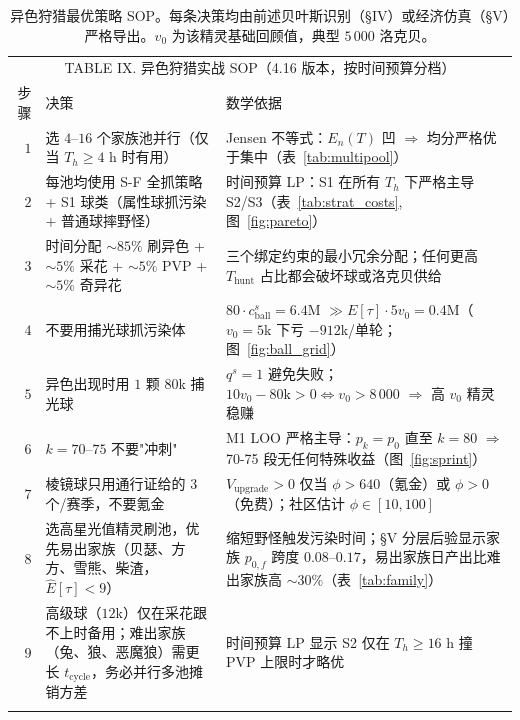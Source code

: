 \documentclass[journal]{IEEEtran}
\begin{document}
\begin{table}[t]
    \begin{center}
        \small
        \begin{tabular}{rp{}p{}}
            \multicolumn{3}{c}{\textsc{TABLE IX. 异色狩猎实战 SOP（4.16 版本，按时间预算分档）}} \\
            \hhline{===}
            步骤 & 决策 & 数学依据 \\
            \hline
            $1$ & 选 $4$--$16$ 个家族池并行（仅当 $T_h \ge 4$ h 时有用） & Jensen 不等式：$E_n(T)$ 凹 $\Rightarrow$ 均分严格优于集中（表~\ref{tab:multipool}） \\
            $2$ & 每池均使用 S-F 全抓策略 + S1 球类（属性球抓污染 + 普通球摔野怪） & 时间预算 LP：S1 在所有 $T_h$ 下严格主导 S2/S3（表~\ref{tab:strat_costs}, 图~\ref{fig:pareto}） \\
            $3$ & 时间分配 $\sim 85\%$ 刷异色 + $\sim 5\%$ 采花 + $\sim 5\%$ PVP + $\sim 5\%$ 奇异花 & 三个绑定约束的最小冗余分配；任何更高 $T_{\text{hunt}}$ 占比都会破坏球或洛克贝供给 \\
            $4$ & 不要用捕光球抓污染体 & $80 \cdot c^s_{\text{ball}} = 6.4$M $\gg E[\tau] \cdot 5 v_0 = 0.4$M（$v_0 = 5$k 下亏 $-912$k/单轮；图~\ref{fig:ball_grid}） \\
            $5$ & 异色出现时用 $1$ 颗 $80$k 捕光球 & $q^s = 1$ 避免失败；$10 v_0 - 80\text{k} > 0 \Leftrightarrow v_0 > 8\,000$ $\Rightarrow$ 高 $v_0$ 精灵稳赚 \\
            $6$ & $k=70$--$75$ 不要"冲刺" & M1 LOO 严格主导：$p_k = p_0$ 直至 $k=80$ $\Rightarrow$ 70-75 段无任何特殊收益（图~\ref{fig:sprint}） \\
            $7$ & 棱镜球只用通行证给的 $3$ 个/赛季，不要氪金 & $V_{\text{upgrade}} > 0$ 仅当 $\phi > 640$（氪金）或 $\phi > 0$（免费）；社区估计 $\phi \in [10, 100]$ \\
            $8$ & 选高星光值精灵刷池，优先易出家族（贝瑟、方方、雪熊、柴渣，$\hat E[\tau] < 9$） & 缩短野怪触发污染时间；§V 分层后验显示家族 $p_{0,f}$ 跨度 $0.08$--$0.17$，易出家族日产出比难出家族高 $\sim 30\%$（表~\ref{tab:family}） \\
            $9$ & 高级球（$12$k）仅在采花跟不上时备用；难出家族（兔、狼、恶魔狼）需更长 $t_{\text{cycle}}$，务必并行多池摊销方差 & 时间预算 LP 显示 S2 仅在 $T_h \ge 16$ h 撞 PVP 上限时才略优 \\
            \hhline{===}
        \end{tabular}
    \end{center}
    \caption{异色狩猎最优策略 SOP。每条决策均由前述贝叶斯识别（§IV）或经济仿真（§V）严格导出。$v_0$ 为该精灵基础回顾值，典型 $5\,000$ 洛克贝。}
    \label{tab:sop}
\end{table}
\end{document}
